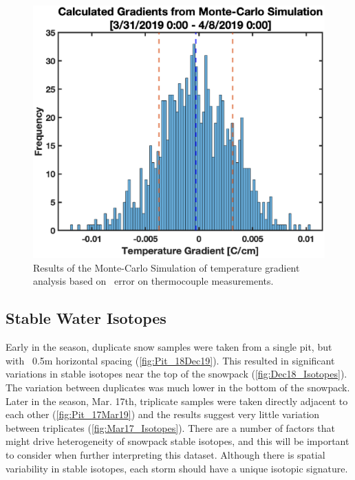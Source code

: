  \begin{figure}[H]
    \centering
    \includegraphics[width=0.7\linewidth]{figures/Uncertainty/MC_Grad.eps}
    \caption{Results of the Monte-Carlo Simulation of temperature gradient analysis based on \isostd \  error on thermocouple measurements.}
    \label{fig:MC_Grad}
 \end{figure}

\subsection{Stable Water Isotopes}
Early in the season, duplicate snow samples were taken from a single pit, but with ~0.5m horizontal spacing (\ref{fig:Pit_18Dec19}). This resulted in significant variations in stable isotopes near the top of the snowpack (\ref{fig:Dec18_Isotopes}). The variation between duplicates was much lower in the bottom of the snowpack. Later in the season, Mar. 17th, triplicate samples were taken directly adjacent to each other (\ref{fig:Pit_17Mar19}) and the results suggest very little variation between triplicates (\ref{fig:Mar17_Isotopes}). There are a number of factors that might drive heterogeneity of snowpack stable isotopes, and this will be important to consider when further interpreting this dataset. Although there is spatial variability in stable isotopes, each storm should have a unique isotopic signature. 

